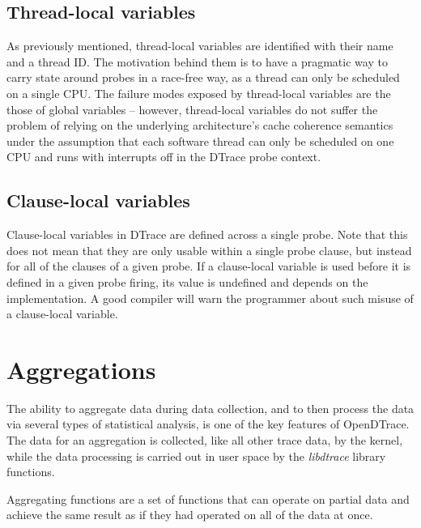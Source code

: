 \subsection{Thread-local variables}
\label{subsec:thread-local-variables}

As previously mentioned, thread-local variables are identified with their name
and a thread ID. The motivation behind them is to have a pragmatic way to carry
state around probes in a race-free way, as a thread can only be scheduled on a
single CPU. The failure modes exposed by thread-local variables are the those of
global variables -- however, thread-local variables do not suffer the problem of
relying on the underlying architecture's cache coherence semantics under the
assumption that each software thread can only be scheduled on one CPU and runs
with interrupts off in the DTrace probe context.

\subsection{Clause-local variables}
\label{subsec:clause-local-variables}

Clause-local variables in DTrace are defined across a single probe. Note that
this does not mean that they are only usable within a single probe clause, but
instead for all of the clauses of a given probe. If a clause-local variable is
used before it is defined in a given probe firing, its value is undefined and
depends on the implementation. A good compiler will warn the programmer about
such misuse of a clause-local variable.

\section{Aggregations}
\label{sec:dlang-aggregations}

The ability to aggregate data during data collection, and to then
process the data via several types of statistical analysis, is one of
the key features of OpenDTrace.  The data for an aggregation is
collected, like all other trace data, by the kernel, while the data
processing is carried out in user space by the \emph{libdtrace}
library functions.

Aggregating functions are a set of functions that can operate on
partial data and achieve the same result as if they had operated
on all of the data at once.

